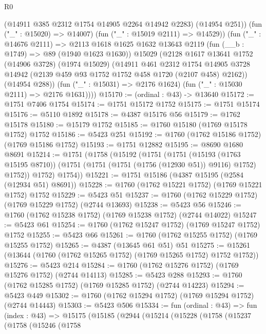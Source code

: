 \begin{lexlean}{R0}
\begin{coremodule}
            (@14911 @385 @2312 @1754 @14905 @2264 @14942 @2283)
            (@14954 @251))
          (fun ("_" : @15020) => @14007)
          (fun ("_" : @15019 @2111) => @14529))
        (fun ("_" : @14676 @2111) =>
        @2113
          @1618
          @1625
          @1632
          @13643
          @2119
          (fun (__b : @1749) => @89 (@1940 @1623 @1630))
          @15029
          (@2128
            @1617
            @13641
            @1752
            (@14906 @3728)
            (@1974 @15029)
            (@14911
              @461
              @2312
              @1754
              @14905
              @3728
              @14942
              (@2139 @459 @93 @1752 @1752 @458 @1720 (@2107 @458) @2162))
            (@14954 @288))
          (fun ("_" : @15031) => @2176 @1624)
          (fun ("_" : @15030 @2111) => @2176 @1631))))
@15170 := (ordinal : @43) -> @13640
@15172 := @1751 @7406 @1754
@15174 := @1751 @15172 @1752
@15175 := @1751 @15174
@15176 := @5110 @1892
@15178 := @4387 @15176 @56
@15179 := @1762 @15178
@15180 := @15179 @1752
@15185 := @1760 @15180 (@1769 @15178 @1752) @1752
@15186 := @5423 @251
@15192 := @1760 (@1762 @15186 @1752) (@1769 @15186 @1752)
@15193 := @1751 @12882
@15195 := @8690 @1680 @8691
@15214 := @1751
    (@1758
      (@15192
        (@1751
          (@1751
            (@15193 (@1763 @15195 @8710))
            (@1751 (@1751 (@1751 (@1756 (@12930 @51)) @9116) @1752) @1752))
          @1752)
        @1754))
@15221 := @1751 @15186 (@4387 @15195 (@2584 (@12934 @51) @8691))
@15228 := @1760 (@1762 @15221 @1752) (@1769 @15221 @1752) @1752
@15229 := @5423 @51
@15237 := @1760 (@1762 @15229 @1752) (@1769 @15229 @1752) (@2744 @13693)
@15238 := @5423 @56
@15246 := @1760 (@1762 @15238 @1752) (@1769 @15238 @1752) (@2744 @14022)
@15247 := @5423 @61
@15254 := @1760 (@1762 @15247 @1752) (@1769 @15247 @1752) @1752
@15255 := @5423 @66
@15261 := @1760 (@1762 @15255 @1752) (@1769 @15255 @1752)
@15265 := @4387 (@13645 @61 @51) @51
@15275 := @15261 (@13644 (@1760 (@1762 @15265 @1752) (@1769 @15265 @1752) @1752 @1752))
@15276 := @5423 @214
@15284 := @1760 (@1762 @15276 @1752) (@1769 @15276 @1752) (@2744 @14113)
@15285 := @5423 @288
@15293 := @1760 (@1762 @15285 @1752) (@1769 @15285 @1752) (@2744 @14223)
@15294 := @5423 @449
@15302 := @1760 (@1762 @15294 @1752) (@1769 @15294 @1752) (@2744 @14443)
@15303 := @5423 @506
@15334 := fun (ordinal : @43) =>
  fun (index : @43) =>
  @15175
    (@15185
      (@2944
        (@15214
          (@15228
            (@1758
              (@15237
                (@1758
                  (@15246
                    (@1758

\end{coremodule}
\end{lexlean}
